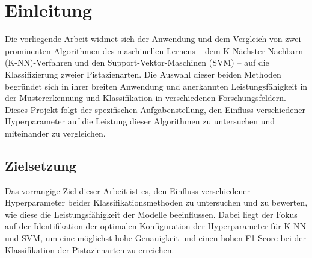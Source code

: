 
\section{Einleitung}
Die vorliegende Arbeit widmet sich der Anwendung und dem Vergleich von zwei prominenten Algorithmen des maschinellen Lernens – dem K-Nächster-Nachbarn (K-NN)-Verfahren und den Support-Vektor-Maschinen (SVM) – auf die Klassifizierung zweier Pistazienarten.
Die Auswahl dieser beiden Methoden begründet sich in ihrer breiten Anwendung und anerkannten Leistungsfähigkeit in der Mustererkennung und Klassifikation in verschiedenen Forschungsfeldern.
Dieses Projekt folgt der spezifischen Aufgabenstellung, den Einfluss verschiedener Hyperparameter auf die Leistung dieser Algorithmen zu untersuchen und miteinander zu vergleichen.

\subsection*{Zielsetzung}
Das vorrangige Ziel dieser Arbeit ist es, den Einfluss verschiedener Hyperparameter beider Klassifikationsmethoden zu untersuchen und zu bewerten, wie diese die Leistungsfähigkeit der Modelle beeinflussen. Dabei liegt der Fokus auf der Identifikation der optimalen Konfiguration der Hyperparameter für K-NN und SVM, um eine möglichst hohe Genauigkeit und einen hohen F1-Score bei der Klassifikation der Pistazienarten zu erreichen.

